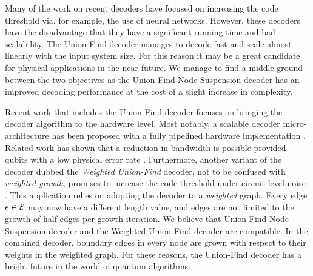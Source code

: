 Many of the work on recent decoders have focused on increasing the code threshold via, for example, the use of neural networks. However, these decoders have the disadvantage that they have a significant running time and bad scalability. The Union-Find decoder manages to decode fast and scale almost-linearly with the input system size. For this reason it may be a great candidate for physical applications in the near future. We manage to find a middle ground between the two objectives as the Union-Find Node-Suspension decoder has an improved decoding performance at the cost of a slight increase in complexity. 

Recent work that includes the Union-Find decoder focuses on bringing the decoder algorithm to the hardware level. Most notably, a scalable decoder micro-architecture has been proposed with a fully pipelined hardware implementation \cite{das2020scalable}. Related work has shown that a reduction in bandwidth is possible provided qubits with a low physical error rate \cite{delfosse2020hierarchical}. Furthermore, another variant of the decoder dubbed the \emph{Weighted Union-Find} decoder, not to be confused with \emph{weighted growth}, promises to increase the code threshold under circuit-level noise \cite{huang2020fault}. This application relies on adopting the decoder to a \emph{weighted} graph. Every edge $e\in\mathcal{E}$ may now have a different length value, and edges are not limited to the growth of half-edges per growth iteration. We believe that Union-Find Node-Suspension decoder and the Weighted Union-Find decoder are compatible. In the combined decoder, boundary edges in every node are grown with respect to their weights in the weighted graph. For these reasons, the Union-Find decoder has a bright future in the world of quantum algorithms.
